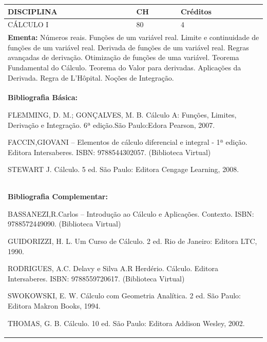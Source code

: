 \documentclass[a4paper, 12pt, openright, oneside, german, french, english, brazil]{abntex2}
\begin{document}
\begin{table}[!h]
  \footnotesize
  \centering
  \begin{tabular}{|p{100mm}|p{10mm}|p{20mm}|}
    \hline
    \textbf{DISCIPLINA} & \textbf{CH} & \textbf{Créditos} \\
    \hline
    CÁLCULO I  & 80 & 4 \\
    \hline
    \multicolumn{3}{|p{130mm}|}{\textbf{Ementa:}  Números reais. Funções de um variável real. Limite e continuidade de funções de um variável real. Derivada de funções de um variável real. Regras avançadas de derivação. Otimização de funções de uma variável. Teorema Fundamental do Cálculo. Teorema do Valor para derivadas. Aplicações da Derivada. Regra de L’Hôpital. Noções de Integração.} \\
    \hline
    \multicolumn{3}{|p{130mm}|}{\textbf{Bibliografia Básica:}

    FLEMMING, D. M.; GONÇALVES, M. B. Cálculo A: Funções, Limites, Derivação e Integração. 6ª edição.São Paulo:Edora Pearson, 2007.

FACCIN,GIOVANI – Elementos de cálculo diferencial e integral - 1ª edição. Editora Intersaberes. ISBN: 9788544302057. (Biblioteca Virtual) 

STEWART J. Cálculo. 5 ed. São Paulo: Editora Cengage Learning, 2008.
} \\
    \hline
    \multicolumn{3}{|p{130mm}|}{\textbf{Bibliografia Complementar:}

    BASSANEZI,R.Carlos – Introdução ao Cálculo e Aplicações. Contexto. ISBN: 9788572449090. (Biblioteca Virtual) 

GUIDORIZZI, H. L. Um Curso de Cálculo. 2 ed. Rio de Janeiro: Editora LTC, 1990. 

RODRIGUES, A.C. Delavy e Silva A.R Herdério. Cálculo. Editora Intersaberes. ISBN: 9788559720617. (Biblioteca Virtual) 

SWOKOWSKI, E. W. Cálculo com Geometria Analítica. 2 ed. São Paulo: Editora Makron Books, 1994. 

THOMAS, G. B. Cálculo. 10 ed. São Paulo: Editora Addison Wesley, 2002.
} \\
    \hline
  \end{tabular}
\end{table}
\end{document}
